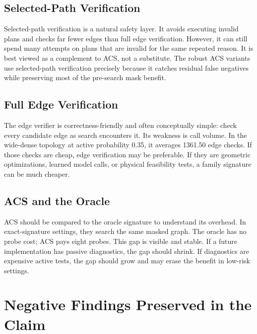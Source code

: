 \documentclass{article}
\newcommand{\ACS}{\textsc{ACS}}
\begin{document}
\subsection{Selected-Path Verification}

Selected-path verification is a natural safety layer. It avoids executing invalid plans and checks far fewer edges than full edge verification. However, it can still spend many attempts on plans that are invalid for the same repeated reason. It is best viewed as a complement to \ACS{}, not a substitute. The robust \ACS{} variants use selected-path verification precisely because it catches residual false negatives while preserving most of the pre-search mask benefit.

\subsection{Full Edge Verification}

The edge verifier is correctness-friendly and often conceptually simple: check every candidate edge as search encounters it. Its weakness is call volume. In the wide-dense topology at active probability 0.35, it averages 1361.50 edge checks. If those checks are cheap, edge verification may be preferable. If they are geometric optimizations, learned model calls, or physical feasibility tests, a family signature can be much cheaper.

\subsection{\ACS{} and the Oracle}

\ACS{} should be compared to the oracle signature to understand its overhead. In exact-signature settings, they search the same masked graph. The oracle has no probe cost; \ACS{} pays eight probes. This gap is visible and stable. If a future implementation has passive diagnostics, the gap should shrink. If diagnostics are expensive active tests, the gap should grow and may erase the benefit in low-risk settings.

\section{Negative Findings Preserved in the Claim}
\end{document}
